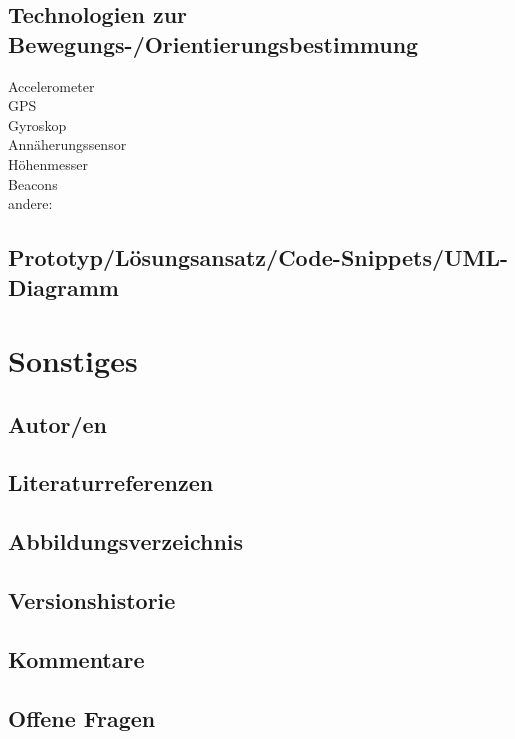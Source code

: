 \technologyCommunicationDesc

\subsection*{Technologien zur Bewegungs-/Orientierungsbestimmung}
\checkbox{\technologyOrientationAccelerometer} Accelerometer \\
\checkbox{\technologyOrientationGPS} GPS \\
\checkbox{\technologyOrientationGyroskop} Gyroskop \\
\checkbox{\technologyOrientationAnnaeherung} Annäherungssensor \\
\checkbox{\technologyOrientationHoehe} Höhenmesser \\
\checkbox{\technologyOrientationBeacons} Beacons \\
\checkbox{\technologyOrientationOther} andere: \\


\subsection*{Prototyp/Lösungsansatz/Code-Snippets/UML-Diagramm}
\prototype




\section*{Sonstiges}

\subsection*{Autor/en}
\authors

\subsection*{Literaturreferenzen}
\literature

\subsection*{Abbildungsverzeichnis}
\figures

\subsection*{Versionshistorie}
\versionhistory

\subsection*{Kommentare}
\comments

\subsection*{Offene Fragen}
\questions

